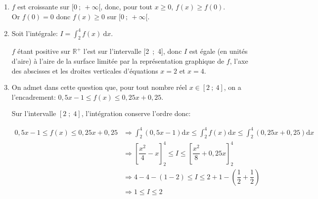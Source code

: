 \documentclass[10pt]{article}
\providecommand{\R}{\mathbb{R}}
\renewcommand{\d}{{\mathrm{d}}}
\providecommand{\ds}{\displaystyle}
\begin{document}
\begin{enumerate}
\item 
$f$ est croissante sur $[0~;~+ \infty[$, donc, pour tout $x\geqslant 0$, $f(x)\geqslant f(0)$.\\ Or $f(0)=0$ donc  $f(x) \geqslant 0$ sur $[0~;~+\infty[$.

\item Soit l'intégrale:
$I = \displaystyle\int_2^4 f(x)\:\text{d}x.$

$f$ étant positive sur $\R^+$ l'est sur l'intervalle [2~;~4], donc $I$ est égale (en unités d'aire) à l'aire de la surface limitée par la représentation graphique de $f$, l'axe des abscisses et les droites verticales d'équations  $x = 2$ et $x = 4$.

\item On admet dans cette question que, pour tout nombre réel $x \in [2~;~4]$, on a
l'encadrement:
$0,5x - 1 \leqslant f(x) \leqslant 0,25x + 0,25.$




Sur l'intervalle $[2\;;\;4]$, l'intégration conserve l'ordre donc:

$\begin{aligned}
0,5x - 1 \leqslant f(x) \leqslant 0,25x + 0,25
& \Longrightarrow \ds\int_2^4 (0,5x - 1) \d x \leqslant \ds\int_2^4 f(x) \d x \leqslant \ds\int_2^4(0,25x + 0,25) \d x\\
& \Longrightarrow\left[\dfrac{x^2}{4}  - x\right]^4_2 \leqslant I \leqslant \left[\dfrac{x^2}{8} + 0,25x  \right]^4_2\\
& \Longrightarrow 4 - 4 - (1 - 2) \leqslant I \leqslant 2 + 1 - \left(\dfrac12 + \dfrac12\right)\\
& \Longrightarrow 1 \leqslant I \leqslant 2
\end{aligned}$

\end{enumerate}

\bigskip
\end{document}
